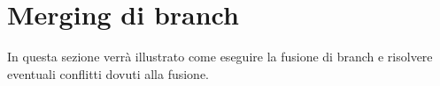 \section{Merging di branch}
In questa sezione verrà illustrato come eseguire la fusione di branch e risolvere eventuali conflitti dovuti alla fusione.




